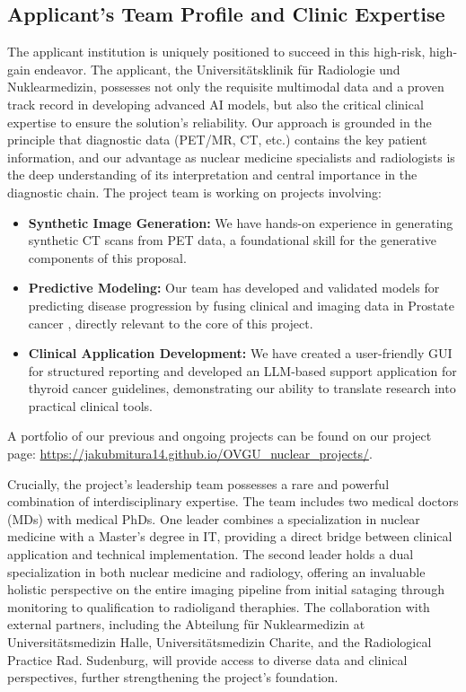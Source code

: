 \documentclass[11pt, a4paper]{article}
\begin{document}
\subsection{Applicant’s Team Profile and Clinic Expertise}
The applicant institution is uniquely positioned to succeed in this high-risk, high-gain endeavor. The applicant, the Universitätsklinik für Radiologie und Nuklearmedizin, possesses not only the requisite multimodal data and a proven track record in developing advanced AI models, but also the critical clinical expertise to ensure the solution's reliability. Our approach is grounded in the principle that diagnostic data (PET/MR, CT, etc.) contains the key patient information, and our advantage as nuclear medicine specialists and radiologists is the deep understanding of its interpretation and central importance in the diagnostic chain. The project team is working on projects involving:
\begin{itemize}
    \item \textbf{Synthetic Image Generation:} We have hands-on experience in generating synthetic CT scans from PET data, a foundational skill for the generative components of this proposal.
    \item \textbf{Predictive Modeling:} Our team has developed and validated models for predicting disease progression by fusing clinical and imaging data in Prostate cancer \cite{Wybranska_2025}, directly relevant to the core of this project.
    \item \textbf{Clinical Application Development:} We have created a user-friendly GUI for structured reporting and developed an LLM-based support application for thyroid cancer guidelines, demonstrating our ability to translate research into practical clinical tools.
\end{itemize}
A portfolio of our previous and ongoing projects can be found on our project page: \url{https://jakubmitura14.github.io/OVGU_nuclear_projects/}.

Crucially, the project's leadership team possesses a rare and powerful combination of interdisciplinary expertise. The team includes two medical doctors (MDs) with medical PhDs. One leader combines a specialization in nuclear medicine with a Master's degree in IT, providing a direct bridge between clinical application and technical implementation. The second leader holds a dual specialization in both nuclear medicine and radiology, offering an invaluable holistic perspective on the entire imaging pipeline from initial sataging through monitoring to qualification to radioligand theraphies. The collaboration with external partners, including the Abteilung für Nuklearmedizin at Universitätsmedizin Halle, Universitätsmedizin Charite, and the Radiological Practice Rad. Sudenburg, will provide access to diverse data and clinical perspectives, further strengthening the project's foundation.
\end{document}
